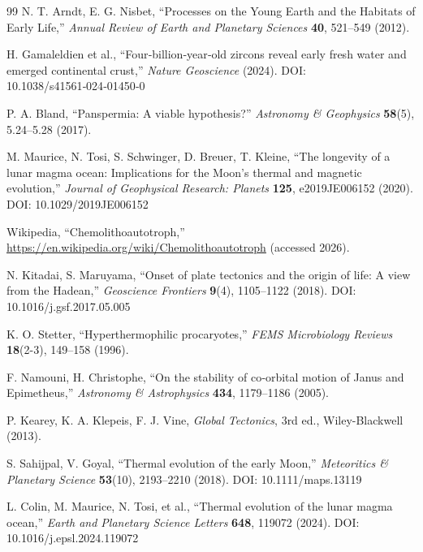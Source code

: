 \documentclass[11pt,a4paper]{article}
\begin{document}
\begin{thebibliography}{99}
		N. T. Arndt, E. G. Nisbet, ``Processes on the Young Earth and the Habitats of Early Life,''
		\emph{Annual Review of Earth and Planetary Sciences} \textbf{40}, 521–549 (2012).
		
		H. Gamaleldien et al., ``Four‑billion‑year‑old zircons reveal early fresh water and emerged continental crust,''
		\emph{Nature Geoscience} (2024). DOI: 10.1038/s41561‑024‑01450‑0
		
		
		P. A. Bland, ``Panspermia: A viable hypothesis?''
		\emph{Astronomy \& Geophysics} \textbf{58}(5), 5.24–5.28 (2017).
		
		M. Maurice, N. Tosi, S. Schwinger, D. Breuer, T. Kleine, ``The longevity of a lunar magma ocean: Implications for the Moon's thermal and magnetic evolution,''
		\emph{Journal of Geophysical Research: Planets} \textbf{125}, e2019JE006152 (2020). DOI: 10.1029/2019JE006152
		
		Wikipedia, ``Chemolithoautotroph,''
		\url{https://en.wikipedia.org/wiki/Chemolithoautotroph} (accessed 2026).
		
		N. Kitadai, S. Maruyama, ``Onset of plate tectonics and the origin of life: A view from the Hadean,''
		\emph{Geoscience Frontiers} \textbf{9}(4), 1105–1122 (2018). DOI: 10.1016/j.gsf.2017.05.005
		
		K. O. Stetter, ``Hyperthermophilic procaryotes,''
		\emph{FEMS Microbiology Reviews} \textbf{18}(2-3), 149–158 (1996).
		
		F. Namouni, H. Christophe, ``On the stability of co‑orbital motion of Janus and Epimetheus,''
		\emph{Astronomy \& Astrophysics} \textbf{434}, 1179–1186 (2005).
		
		P. Kearey, K. A. Klepeis, F. J. Vine, \emph{Global Tectonics}, 3rd ed., Wiley-Blackwell (2013).
		
		S. Sahijpal, V. Goyal, ``Thermal evolution of the early Moon,''
		\emph{Meteoritics \& Planetary Science} \textbf{53}(10), 2193–2210 (2018).
		DOI: 10.1111/maps.13119
		
		L. Colin, M. Maurice, N. Tosi, et al., ``Thermal evolution of the lunar magma ocean,''
		\emph{Earth and Planetary Science Letters} \textbf{648}, 119072 (2024).
		DOI: 10.1016/j.epsl.2024.119072
		

\end{thebibliography}
\end{document}
